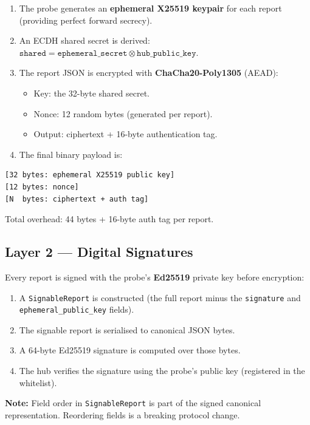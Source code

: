 \documentclass[12pt]{report}
\begin{document}
\begin{enumerate}
    \item The probe generates an \textbf{ephemeral X25519 keypair} for each
          report (providing perfect forward secrecy).
    \item An ECDH shared secret is derived:
          $\texttt{shared} = \texttt{ephemeral\_secret} \otimes
          \texttt{hub\_public\_key}$.
    \item The report JSON is encrypted with
          \textbf{ChaCha20-Poly1305} (AEAD):
    \begin{itemize}
        \item Key: the 32-byte shared secret.
        \item Nonce: 12 random bytes (generated per report).
        \item Output: ciphertext + 16-byte authentication tag.
    \end{itemize}
    \item The final binary payload is:
\end{enumerate}

\begin{lstlisting}
[32 bytes: ephemeral X25519 public key]
[12 bytes: nonce]
[N  bytes: ciphertext + auth tag]
\end{lstlisting}

Total overhead: 44 bytes + 16-byte auth tag per report.

\subsection{Layer 2 --- Digital Signatures}

Every report is signed with the probe's \textbf{Ed25519} private key before
encryption:

\begin{enumerate}
    \item A \texttt{SignableReport} is constructed (the full report minus the
          \texttt{signature} and \texttt{ephemeral\_public\_key} fields).
    \item The signable report is serialised to canonical JSON bytes.
    \item A 64-byte Ed25519 signature is computed over those bytes.
    \item The hub verifies the signature using the probe's public key
          (registered in the whitelist).
\end{enumerate}

\textbf{Note:} Field order in \texttt{SignableReport} is part of the signed
canonical representation. Reordering fields is a breaking protocol change.
\end{document}
